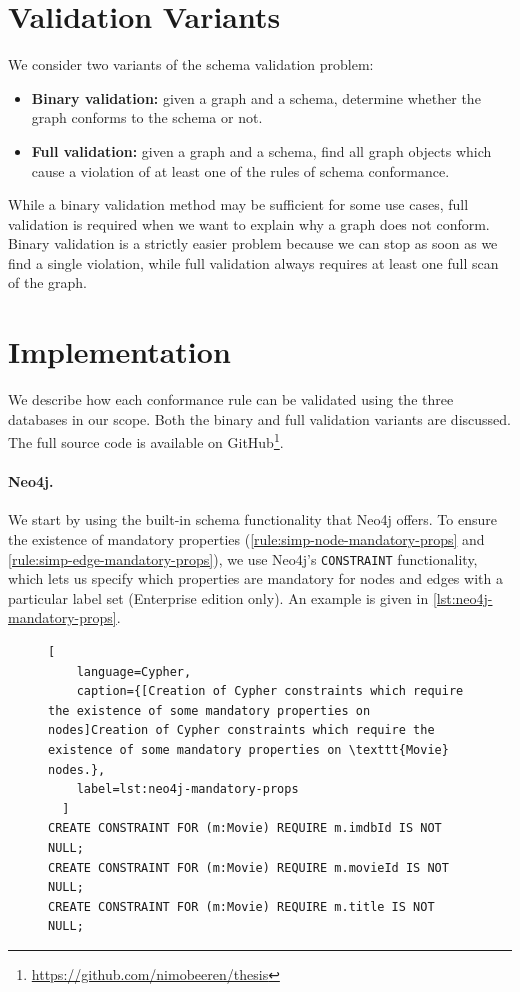 \documentclass{report}
\theoremstyle{definition}
\begin{document}
\section{Validation Variants}
\label{sec:variants}

We consider two variants of the schema validation problem:

\begin{itemize}
  \item \textbf{Binary validation:} given a graph and a schema, determine whether the graph conforms to the schema or not.
  \item \textbf{Full validation:} given a graph and a schema, find all graph objects which cause a violation of at least one of the rules of schema conformance.
\end{itemize}

While a binary validation method may be sufficient for some use cases, full validation is required when we want to explain why a graph does not conform. Binary validation is a strictly easier problem because we can stop as soon as we find a single violation, while full validation always requires at least one full scan of the graph.


\section{Implementation}

We describe how each conformance rule can be validated using the three databases in our scope. Both the binary and full validation variants are discussed. The full source code is available on GitHub\footnote{\url{https://github.com/nimobeeren/thesis}}.

\paragraph{Neo4j.} We start by using the built-in schema functionality that Neo4j offers. To ensure the existence of mandatory properties (\autoref{rule:simp-node-mandatory-props} and \ref{rule:simp-edge-mandatory-props}), we use Neo4j's \texttt{CONSTRAINT} functionality, which lets us specify which properties are mandatory for nodes and edges with a particular label set (Enterprise edition only). An example is given in \autoref{lst:neo4j-mandatory-props}.

\begin{figure}[H]
  \begin{lstlisting}[
    language=Cypher,
    caption={[Creation of Cypher constraints which require the existence of some mandatory properties on nodes]Creation of Cypher constraints which require the existence of some mandatory properties on \texttt{Movie} nodes.},
    label=lst:neo4j-mandatory-props
  ]
CREATE CONSTRAINT FOR (m:Movie) REQUIRE m.imdbId IS NOT NULL;
CREATE CONSTRAINT FOR (m:Movie) REQUIRE m.movieId IS NOT NULL;
CREATE CONSTRAINT FOR (m:Movie) REQUIRE m.title IS NOT NULL;
  \end{lstlisting}
\end{figure}
\end{document}
